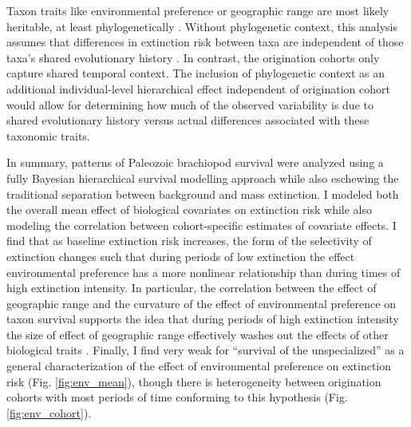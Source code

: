 \documentclass{article}
\begin{document}
Taxon traits like environmental preference or geographic range \citep{Jablonski1987,Hunt2005b} are most likely heritable, at least phylogenetically \citep{Lynch1991,Housworth2004}. Without phylogenetic context, this analysis assumes that differences in extinction risk between taxa are independent of those taxa's shared evolutionary history \citep{Felsenstein1985b}. In contrast, the origination cohorts only capture shared temporal context. The inclusion of phylogenetic context as an additional individual-level hierarchical effect independent of origination cohort would allow for determining how much of the observed variability is due to shared evolutionary history versus actual differences associated with these taxonomic traits. 

In summary, patterns of Paleozoic brachiopod survival were analyzed using a fully Bayesian hierarchical survival modelling approach while also eschewing the traditional separation between background and mass extinction. I modeled both the overall mean effect of biological covariates on extinction risk while also modeling the correlation between cohort-specific estimates of covariate effects. I find that as baseline extinction risk increases, the form of the selectivity of extinction changes such that during periods of low extinction the effect environmental preference has a more nonlinear relationship than during times of high extinction intensity. In particular, the correlation between the effect of geographic range and the curvature of the effect of environmental preference on taxon survival supports the idea that during periods of high extinction intensity the size of effect of geographic range effectively washes out the effects of other biological traits \citep{Jablonski1987,Raup1991b}. Finally, I find very weak for ``survival of the unspecialized'' \citep{Simpson1944,Liow2004a,Liow2007b,Nurnberg2013a,Nurnberg2015} as a general characterization of the effect of environmental preference on extinction risk (Fig. \ref{fig:env_mean}), though there is heterogeneity between origination cohorts with most periods of time conforming to this hypothesis (Fig. \ref{fig:env_cohort}). 
\end{document}
